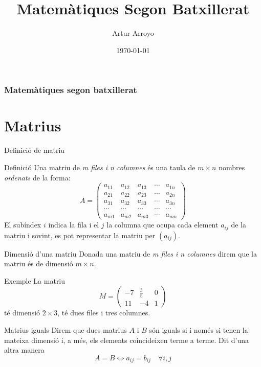 \documentclass{beamer}
\begin{document}
\title{Matemàtiques Segon Batxillerat}
\author{Artur Arroyo}
\date{\today}


\begin{frame}
\titlepage
\end{frame}

\begin{frame}\frametitle{Matemàtiques segon batxillerat}\tableofcontents[pausesubsections]
\end{frame}


\section{Matrius}

\begin{frame}{Definició de matriu}
\begin{block}{Definició}
Una matriu de \emph{m files i n columnes} és una taula de $m\times n$ nombres \emph{ordenats} de la forma:
\[A=\left(\begin{array}{cccccc}
a_{11} & a_{12} & a_{13} & \cdots & a_{1n}\\
a_{21} & a_{22} & a_{23} & \cdots & a_{2n}\\
a_{31} & a_{32} & a_{33} & \cdots & a_{3n}\\
\cdots & \cdots & \cdots & \cdots & \cdots\\
a_{m1} & a_{m2} & a_{m3} & \cdots & a_{mn}
\end{array}\right)
\]
El subíndex $i$ indica la fila i el $j$ la columna que ocupa cada element $a_{ij}$ de la matriu i sovint, es pot representar la matriu per $(a_{ij})$.
\end{block}
\end{frame}

\begin{frame}
\begin{block}{Dimensió d'una matriu}
Donada una matriu de  \emph{m files i n columnes} direm que la matriu és de dimensió $m\times n$.
\end{block}
\begin{exampleblock}{Exemple}
La matriu \[M=\left(\begin{array}{ccc}
-7 & \frac{3}{5} & 0\\
11 & -4 & 1
\end{array}\right)
\]
té dimensió $2\times3$, té dues files i tres columnes.
\end{exampleblock}
\begin{block}{Matrius iguals}
Direm que dues matrius $A$ i $B$ són iguals si i només si tenen la mateixa dimensió i, a més, els elements coincideixen terme a terme. Dit d'una altra manera
$$A=B\Leftrightarrow a_{ij}=b_{ij}\quad\forall i,j$$
\end{block}
\end{frame}
\end{document}
